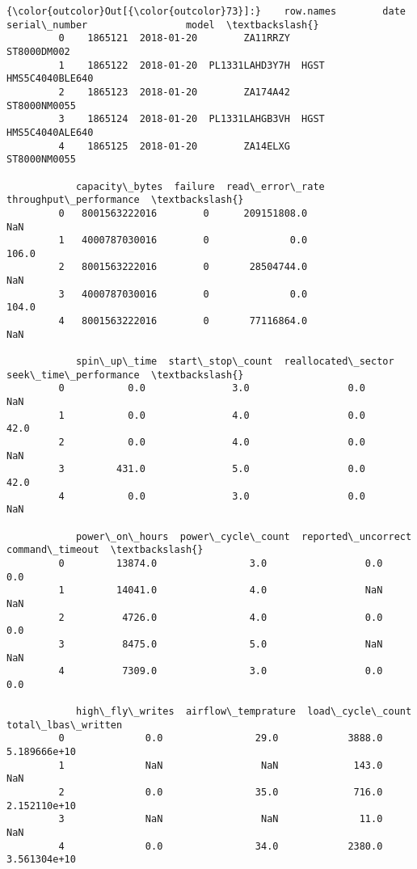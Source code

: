 \documentclass[11pt]{article}
\begin{document}
\begin{Verbatim}[commandchars=\\\{\}]
{\color{outcolor}Out[{\color{outcolor}73}]:}    row.names        date   serial\_number                 model  \textbackslash{}
         0    1865121  2018-01-20        ZA11RRZY           ST8000DM002   
         1    1865122  2018-01-20  PL1331LAHD3Y7H  HGST HMS5C4040BLE640   
         2    1865123  2018-01-20        ZA174A42          ST8000NM0055   
         3    1865124  2018-01-20  PL1331LAHGB3VH  HGST HMS5C4040ALE640   
         4    1865125  2018-01-20        ZA14ELXG          ST8000NM0055   
         
            capacity\_bytes  failure  read\_error\_rate  throughput\_performance  \textbackslash{}
         0   8001563222016        0      209151808.0                     NaN   
         1   4000787030016        0              0.0                   106.0   
         2   8001563222016        0       28504744.0                     NaN   
         3   4000787030016        0              0.0                   104.0   
         4   8001563222016        0       77116864.0                     NaN   
         
            spin\_up\_time  start\_stop\_count  reallocated\_sector  seek\_time\_performance  \textbackslash{}
         0           0.0               3.0                 0.0                    NaN   
         1           0.0               4.0                 0.0                   42.0   
         2           0.0               4.0                 0.0                    NaN   
         3         431.0               5.0                 0.0                   42.0   
         4           0.0               3.0                 0.0                    NaN   
         
            power\_on\_hours  power\_cycle\_count  reported\_uncorrect  command\_timeout  \textbackslash{}
         0         13874.0                3.0                 0.0              0.0   
         1         14041.0                4.0                 NaN              NaN   
         2          4726.0                4.0                 0.0              0.0   
         3          8475.0                5.0                 NaN              NaN   
         4          7309.0                3.0                 0.0              0.0   
         
            high\_fly\_writes  airflow\_temprature  load\_cycle\_count  total\_lbas\_written  
         0              0.0                29.0            3888.0        5.189666e+10  
         1              NaN                 NaN             143.0                 NaN  
         2              0.0                35.0             716.0        2.152110e+10  
         3              NaN                 NaN              11.0                 NaN  
         4              0.0                34.0            2380.0        3.561304e+10  
\end{Verbatim}
            
\end{document}
